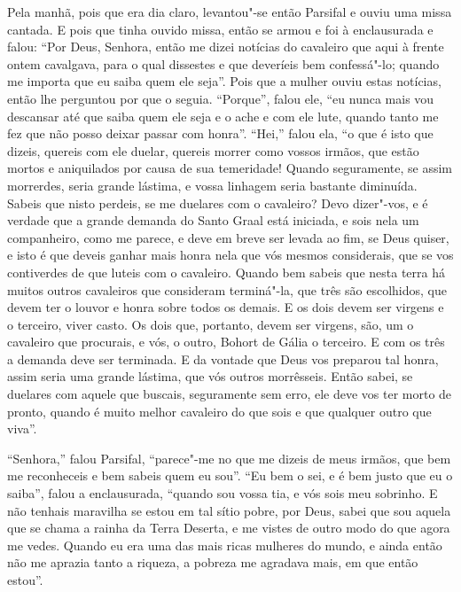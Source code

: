 Pela manhã, pois que era dia claro, levantou"-se então Parsifal e ouviu uma
missa cantada. E pois que tinha ouvido missa, então se armou e foi à
enclausurada e falou: “Por Deus, Senhora, então me dizei notícias do cavaleiro
que aqui à frente ontem cavalgava, para o qual dissestes  e que deveríeis bem
confessá"-lo; quando me importa que eu saiba quem ele seja”. Pois que a mulher
ouviu estas notícias, então lhe perguntou por que o seguia. “Porque”, falou
ele, “eu nunca mais vou descansar até que saiba quem ele seja e o ache e com ele
lute, quando tanto me fez que não posso deixar passar com honra”. “Hei,” falou
ela, “o que é isto que dizeis, quereis com ele duelar, quereis morrer como
vossos irmãos, que estão mortos e aniquilados por causa de sua temeridade!
Quando seguramente, se assim morrerdes, seria grande lástima, e vossa linhagem
seria bastante diminuída. Sabeis  que nisto perdeis, se me duelares
com o cavaleiro? Devo dizer"-vos,  e é verdade que a grande demanda do Santo
Graal está iniciada, e sois nela um companheiro, como me parece, e deve em
breve ser levada ao fim, se Deus quiser, e isto é que deveis ganhar mais honra
nela que vós mesmos considerais, que se vos contiverdes de que luteis com o
cavaleiro. Quando bem sabeis que nesta terra há muitos outros cavaleiros que
consideram terminá"-la, que três são escolhidos, que devem ter o louvor e honra
sobre todos os demais. E os dois devem ser virgens e o terceiro, viver casto. Os
dois que, portanto, devem ser virgens, são, um o cavaleiro que procurais, e
vós, o outro, Bohort de Gália o terceiro. E com os três a demanda deve ser
terminada. E da vontade que Deus vos preparou tal honra, assim seria uma grande
lástima, que vós outros morrêsseis. Então sabei, se duelares com aquele que
buscais, seguramente sem erro, ele deve vos ter morto de pronto, quando é muito
melhor cavaleiro do que sois e que qualquer outro que viva”. 

“Senhora,” falou Parsifal, “parece"-me no que me dizeis de meus irmãos, que
bem me reconheceis e bem sabeis quem eu sou”. “Eu bem o sei, e é bem justo que
eu o saiba”, falou a enclausurada, “quando sou vossa tia, e vós sois meu
sobrinho. E não tenhais maravilha se estou em tal sítio pobre, por Deus, sabei
que sou aquela que se chama a rainha da Terra Deserta, e me vistes de outro
modo do que agora me vedes. Quando eu era uma das mais ricas mulheres do mundo,
e ainda então não me aprazia tanto a riqueza, a pobreza me agradava mais, em
que então estou”. 

